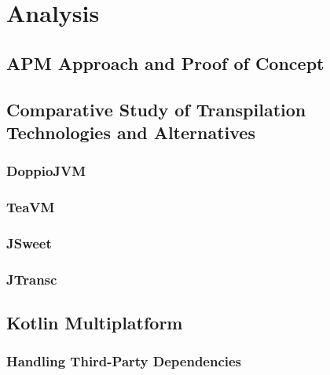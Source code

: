 \chapter{Analysis}
\label{chap:analysis}
\section{APM Approach and Proof of Concept}
\label{sec:apm-approach-and-proof-of-concept}
\section{Comparative Study of Transpilation Technologies and Alternatives}
\label{sec:comparative-study-of-transpilation-technologies-and-alternatives}
\subsection{DoppioJVM}
\label{ssec:doppiojvm}
\subsection{TeaVM}
\label{ssec:teavm}
\subsection{JSweet}
\label{ssec:jsweet}
\subsection{JTransc}
\label{ssec:jtransc}
\section{Kotlin Multiplatform}
\label{sec:kotlin-multiplatform}
\subsection{Handling Third-Party Dependencies}
\label{ssec:handling-third-party-dependencies}
